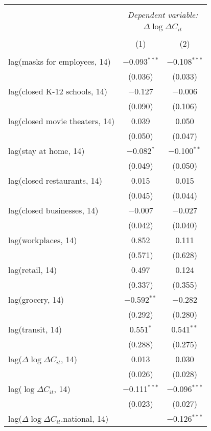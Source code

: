 \begin{tabular}{@{\extracolsep{1pt}}lcc} 
\\[-1.8ex]\hline 
\hline \\[-1.8ex] 
 & \multicolumn{2}{c}{\textit{Dependent variable:}} \\ 
\cline{2-3} 
 & \multicolumn{2}{c}{$\Delta \log \Delta C_{it}$} \\ 
\\[-1.8ex] & (1) & (2)\\ 
\hline \\[-1.8ex] 
 lag(masks for employees, 14) & $-$0.093$^{***}$ & $-$0.108$^{***}$ \\ 
  & (0.036) & (0.033) \\ 
  lag(closed K-12 schools, 14) & $-$0.127 & $-$0.006 \\ 
  & (0.090) & (0.106) \\ 
  lag(closed movie theaters, 14) & 0.039 & 0.050 \\ 
  & (0.050) & (0.047) \\ 
  lag(stay at home, 14) & $-$0.082$^{*}$ & $-$0.100$^{**}$ \\ 
  & (0.049) & (0.050) \\ 
  lag(closed restaurants, 14) & 0.015 & 0.015 \\ 
  & (0.045) & (0.044) \\ 
  lag(closed businesses, 14) & $-$0.007 & $-$0.027 \\ 
  & (0.042) & (0.040) \\ 
  lag(workplaces, 14) & 0.852 & 0.111 \\ 
  & (0.571) & (0.628) \\ 
  lag(retail, 14) & 0.497 & 0.124 \\ 
  & (0.337) & (0.355) \\ 
  lag(grocery, 14) & $-$0.592$^{**}$ & $-$0.282 \\ 
  & (0.292) & (0.280) \\ 
  lag(transit, 14) & 0.551$^{*}$ & 0.541$^{**}$ \\ 
  & (0.288) & (0.275) \\ 
  lag($\Delta \log \Delta C_{it}$, 14) & 0.013 & 0.030 \\ 
  & (0.026) & (0.028) \\ 
  lag($\log \Delta C_{it}$, 14) & $-$0.111$^{***}$ & $-$0.096$^{***}$ \\ 
  & (0.023) & (0.027) \\ 
  lag($\Delta \log \Delta C_{it}$.national, 14) &  & $-$0.126$^{***}$ \\ 

\end{tabular}

